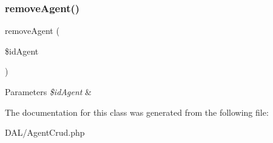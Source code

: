 \subsubsection{\texorpdfstring{removeAgent()}{removeAgent()}}
{\footnotesize\ttfamily remove\+Agent (\begin{DoxyParamCaption}\item[{}]{\$id\+Agent }\end{DoxyParamCaption})}


\begin{DoxyParams}{Parameters}
{\em \$id\+Agent} & \\
\hline
\end{DoxyParams}


The documentation for this class was generated from the following file\+:\begin{DoxyCompactItemize}
\item 
D\+A\+L/Agent\+Crud.\+php\end{DoxyCompactItemize}
